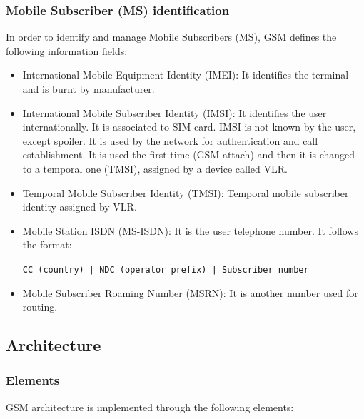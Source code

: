 \documentclass[../main.tex]{subfiles}
\begin{document}
\subsubsection{Mobile Subscriber (MS) identification}

In order to identify and manage Mobile Subscribers (MS), GSM defines the following information fields:

\begin{itemize}
	\item International Mobile Equipment Identity (IMEI): It identifies the terminal and is burnt by manufacturer.
	\item International Mobile Subscriber Identity (IMSI): It identifies the user internationally. It is associated to SIM card. IMSI is not known by the user, except spoiler. It is used by the network for authentication and call establishment. It is used the first time (GSM attach) and then it is changed to a temporal one (TMSI), assigned by a device called VLR.
	\item Temporal Mobile Subscriber Identity (TMSI): Temporal mobile subscriber identity assigned by VLR.
	\item {
		Mobile Station ISDN (MS-ISDN): It is the user telephone number. It follows the format:

		\texttt{CC (country) | NDC (operator prefix) | Subscriber number}
	}
	\item Mobile Subscriber Roaming Number (MSRN): It is another number used for routing.
\end{itemize}

\subsection{Architecture}

\subsubsection{Elements}

GSM architecture is implemented through the following elements:
\end{document}
